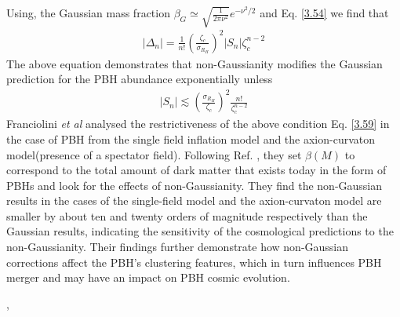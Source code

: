 Using, the Gaussian mass fraction $\beta_{G} \simeq \sqrt{\frac{1}{2\pi\nu^{2}}}e^{-\nu^{2}/2}$ and Eq. \ref{3.54} we find that
\begin{align}
    \left|\Delta_{n}\right|=\frac{1}{n !}\left(\frac{\zeta_{c}}{\sigma_{R_{H}}}\right)^{2}\left|S_{n}\right| \zeta_{c}^{n-2} \label{3.58}
\end{align}
The above equation demonstrates that non-Gaussianity modifies the Gaussian prediction for the PBH abundance exponentially unless
\begin{align}
    \left|S_{n}\right| \lesssim\left(\frac{\sigma_{R_{H}}}{\zeta_{c}}\right)^{2} \frac{n !}{\zeta_{c}^{n-2}} \label{3.59}
\end{align}
Franciolini \emph{et al}\cite{Franciolini:2018vbk} analysed the restrictiveness of the above condition Eq. \ref{3.59} in the case of PBH from the single field inflation model and the axion-curvaton model(presence of a spectator field). Following Ref. \cite{Motohashi:2017kbs}, they set $\beta(M)$ to correspond to the total amount of dark matter that exists today in the form of PBHs and look for the effects of non-Gaussianity. They find the non-Gaussian results in the cases of the single-field model and the axion-curvaton model are smaller by about ten and twenty orders of magnitude respectively than the Gaussian results, indicating the sensitivity of the cosmological predictions to the non-Gaussianity. Their findings further demonstrate how non-Gaussian corrections affect the PBH's clustering features, which in turn influences PBH merger and may have an impact on PBH cosmic evolution.




    



,